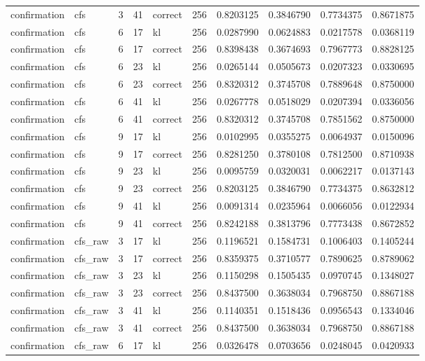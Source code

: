 \begin{tabular}{llrrlrrrrr}
confirmation & cfs & 3 & 41 & correct & 256 & 0.8203125 & 0.3846790 & 0.7734375 & 0.8671875 \\
confirmation & cfs & 6 & 17 & kl & 256 & 0.0287990 & 0.0624883 & 0.0217578 & 0.0368119 \\
confirmation & cfs & 6 & 17 & correct & 256 & 0.8398438 & 0.3674693 & 0.7967773 & 0.8828125 \\
confirmation & cfs & 6 & 23 & kl & 256 & 0.0265144 & 0.0505673 & 0.0207323 & 0.0330695 \\
confirmation & cfs & 6 & 23 & correct & 256 & 0.8320312 & 0.3745708 & 0.7889648 & 0.8750000 \\
confirmation & cfs & 6 & 41 & kl & 256 & 0.0267778 & 0.0518029 & 0.0207394 & 0.0336056 \\
confirmation & cfs & 6 & 41 & correct & 256 & 0.8320312 & 0.3745708 & 0.7851562 & 0.8750000 \\
confirmation & cfs & 9 & 17 & kl & 256 & 0.0102995 & 0.0355275 & 0.0064937 & 0.0150096 \\
confirmation & cfs & 9 & 17 & correct & 256 & 0.8281250 & 0.3780108 & 0.7812500 & 0.8710938 \\
confirmation & cfs & 9 & 23 & kl & 256 & 0.0095759 & 0.0320031 & 0.0062217 & 0.0137143 \\
confirmation & cfs & 9 & 23 & correct & 256 & 0.8203125 & 0.3846790 & 0.7734375 & 0.8632812 \\
confirmation & cfs & 9 & 41 & kl & 256 & 0.0091314 & 0.0235964 & 0.0066056 & 0.0122934 \\
confirmation & cfs & 9 & 41 & correct & 256 & 0.8242188 & 0.3813796 & 0.7773438 & 0.8672852 \\
confirmation & cfs_raw & 3 & 17 & kl & 256 & 0.1196521 & 0.1584731 & 0.1006403 & 0.1405244 \\
confirmation & cfs_raw & 3 & 17 & correct & 256 & 0.8359375 & 0.3710577 & 0.7890625 & 0.8789062 \\
confirmation & cfs_raw & 3 & 23 & kl & 256 & 0.1150298 & 0.1505435 & 0.0970745 & 0.1348027 \\
confirmation & cfs_raw & 3 & 23 & correct & 256 & 0.8437500 & 0.3638034 & 0.7968750 & 0.8867188 \\
confirmation & cfs_raw & 3 & 41 & kl & 256 & 0.1140351 & 0.1518436 & 0.0956543 & 0.1334046 \\
confirmation & cfs_raw & 3 & 41 & correct & 256 & 0.8437500 & 0.3638034 & 0.7968750 & 0.8867188 \\
confirmation & cfs_raw & 6 & 17 & kl & 256 & 0.0326478 & 0.0703656 & 0.0248045 & 0.0420933 \\

\end{tabular}

